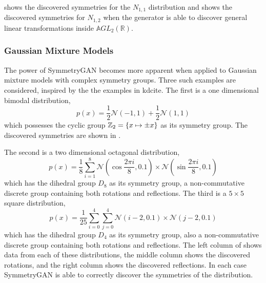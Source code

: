                  shows the discovered symmetries for the \(N_{1, 1}\) distribution and  shows the discovered symmetries for \(N_{1, 2}\) when the generator is able to discover general linear transformations inside \(\mathbb{A}GL_2(\mathbb{R})\).
            \subsubsection{Gaussian Mixture Models}
                The power of SymmetryGAN becomes more apparent when applied to Gaussian mixture models with complex symmetry groups.
                Three such examples are considered, inspired by the the examples in kd{cite}.
                The first is a one dimensional bimodal distribution,
                \[
                    p(x) = \frac{1}{2} \mathcal{N}(-1, 1) + \frac{1}{2} \mathcal{N}(1, 1)
                \]
                which possesses the cyclic group \(\mathbb{Z}_2 = \qty{x \mapsto \pm x}\) as its symmetry group.
                The discovered symmetries are shown in .
                
                The second is a two dimensional octagonal distribution,
                \[
                    p(x) = \frac{1}{8}\sum_{i=1}^{8} \mathcal{N}(\cos\frac{2\pi i}{8}, 0.1)\times \mathcal{N}(\sin\frac{2\pi i}{8}, 0.1)
                \]
                which has the dihedral group \(D_8\) as its symmetry group, a non-commutative discrete group containing both rotations and reflections.
                The third is a \(5\times 5\) square distribution,
                \[
                    p(x) = \frac{1}{25}\sum_{i=0}^{4}\sum_{j=0}^{4} \mathcal{N}(i-2, 0.1)\times \mathcal{N}(j-2, 0.1)
                \]
                which has the dihedral group \(D_4\) as its symmetry group, also a non-commutative discrete group containing both rotations and reflections.
                The left column of  shows data from each of these distributions, the middle column shows the discovered rotations, and the right column shows the discovered reflections.
                In each case SymmetryGAN is able to correctly discover the symmetries of the distribution.

